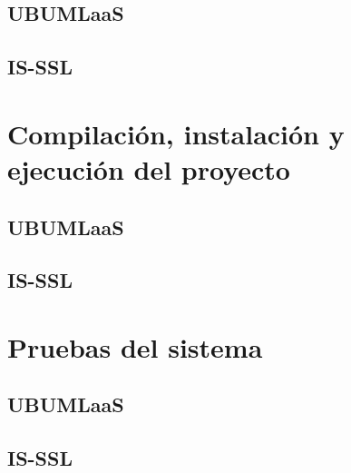 \subsection{UBUMLaaS}

\subsection{IS-SSL}

\section{Compilación, instalación y ejecución del proyecto}
\subsection{UBUMLaaS}

\subsection{IS-SSL}

\section{Pruebas del sistema}
\subsection{UBUMLaaS}

\subsection{IS-SSL}
